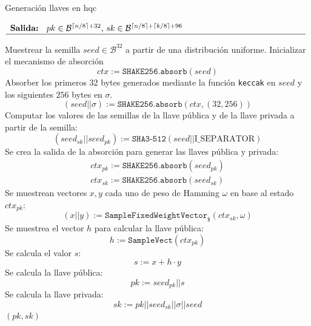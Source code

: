 \begin{algorithm}[H]
	\small
	\caption{Generación llaves en \acrshort{hqc}}
	$\begin{array}{p{\textwidth}}
		\textbf{Salida: } \(pk\in \mathcal{B}^{\lceil n/8 \rceil+32}\), \(sk\in \mathcal{B}^{\lceil n/8 \rceil+\lceil k/8 \rceil+96}\) \\ 
		\hline
	\end{array}$
	\begin{algorithmic}[1]
		\State Muestrear la semilla \(seed\in \mathcal{B}^{32}\) a partir de una distribución uniforme.
		\State Inicializar el mecanismo de absorción
		\begin{equation}
			ctx:=\texttt{SHAKE256.absorb}(seed)
		\end{equation} 
		\State Absorber los primeros \(32\) bytes generados mediante la función \texttt{keccak} en \(seed\) y los siguientes \(256\) bytes en \(\sigma\).
		\begin{equation}
			(seed||\sigma):=\texttt{SHAKE256.absorb}(ctx,(32,256))
		\end{equation}
		\State Computar los valores de las semillas de la llave pública y de la llave privada a partir de la semilla:
		\begin{equation}
			(seed_{sk}||seed_{pk}):=\texttt{SHA3-512}(seed||{\text{I\_SEPARATOR}})
		\end{equation}
		\State Se crea la salida de la absorción para generar las llaves pública y privada:
		\begin{equation}
			\begin{array}{l}
				ctx_{pk}:=\texttt{SHAKE256.absorb}(seed_{pk})\\
				ctx_{sk}:=\texttt{SHAKE256.absorb}(seed_{sk})
			\end{array}
		\end{equation}
		\State Se muestrean vectores \(x,y\) cada uno de peso de Hamming \(\omega\) en base al estado $ctx_{pk}$:
		\begin{equation}
			(x||y):=\texttt{SampleFixedWeightVector}_{\$}(ctx_{sk}, \omega)
		\end{equation}
		\State Se muestrea el vector \(h\) para calcular la llave pública:
		\begin{equation}
			h:=\texttt{SampleVect}(ctx_{pk})
		\end{equation}
		\State Se calcula el valor \(s\):
		\begin{equation}
			s:=x+h\cdot y
		\end{equation}
		\State Se calcula la llave pública:
		\begin{equation}
			pk:=seed_{pk}||s
		\end{equation}
		\State Se calcula la llave privada:
		\begin{equation}
			sk:=pk||seed_{sk}||\sigma||seed
		\end{equation}
		\State \Return $(pk,sk)$
	\end{algorithmic}
\end{algorithm}



